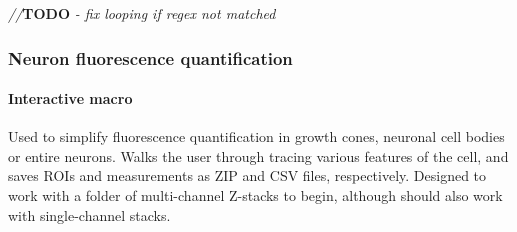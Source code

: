 \documentclass[
  12pt,
  a4paper,
]{book}
\newenvironment{Shaded}{}{}
\newcommand{\AlertTok}[1]{\textcolor[rgb]{1.00,0.00,0.00}{\textbf{#1}}}
\newcommand{\CommentTok}[1]{\textcolor[rgb]{0.38,0.63,0.69}{\textit{#1}}}
\begin{document}
\begin{Shaded}
\begin{Highlighting}[]
\CommentTok{//}\AlertTok{TODO}\CommentTok{ {-} fix looping if regex not matched}
\end{Highlighting}
\end{Shaded}

\hypertarget{neuron-fluorescence-quantification}{%
\subsubsection{Neuron fluorescence quantification}\label{neuron-fluorescence-quantification}}

\hypertarget{fluor-quant}{%
\paragraph{Interactive macro}\label{fluor-quant}}

Used to simplify fluorescence quantification in growth cones, neuronal cell bodies or entire neurons. Walks the user through tracing various features of the cell, and saves ROIs and measurements as ZIP and CSV files, respectively. Designed to work with a folder of multi-channel Z-stacks to begin, although should also work with single-channel stacks.
\end{document}
